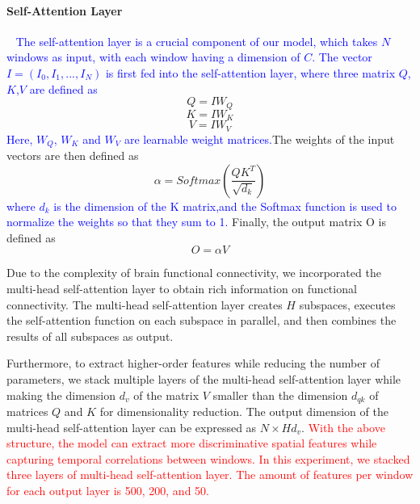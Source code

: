 \documentclass[a4paper]{cas-dc}
\begin{document}
\paragraph{Self-Attention Layer}~{}
\newline
\indent \textcolor{blue}{The self-attention layer is a crucial component of our model, which takes $N$ windows as input, with each window having a dimension of $C$. The vector $I = (I_0, I_1,..., I_N)$ is first fed into the self-attention layer, where three matrix $Q$,$K$,$V$ are defined as}
\begin{equation}
	Q = IW_Q
\end{equation}
\begin{equation}
	K = IW_K
\end{equation}
\begin{equation}
	V = IW_V
\end{equation}
\textcolor{blue}{Here, $W_Q$, $W_K$ and $W_V$ are learnable weight matrices.}The weights of the input vectors are then defined as
\begin{equation}
	\alpha = Softmax(\frac{QK^T}{\sqrt{d_k}})
\end{equation}
\textcolor{blue}{where $d_k$ is the dimension of the K matrix,and the Softmax function is used to normalize the weights so that they sum to 1.} Finally, the output matrix O is defined as
\begin{equation}
	O = \alpha V
\end{equation}

Due to the complexity of brain functional connectivity, we incorporated the multi-head self-attention layer to obtain rich information on functional connectivity. The multi-head self-attention layer creates $H$ subspaces, executes the self-attention function on each subspace in parallel, and then combines the results of all subspaces as output.

Furthermore, to extract higher-order features while reducing the number of parameters, we stack multiple layers of the multi-head self-attention layer while making the dimension $d_v$ of the matrix $V$ smaller than the dimension $d_{qk}$ of matrices $Q$ and $K$ for dimensionality reduction. The output dimension of the multi-head self-attention layer can be expressed as $N\times Hd_v$. \textcolor{red}{With the above structure, the model can extract more discriminative spatial features while capturing temporal correlations between windows. In this experiment, we stacked three layers of multi-head self-attention layer. The amount of features per window for each output layer is 500, 200, and 50.}
\end{document}
